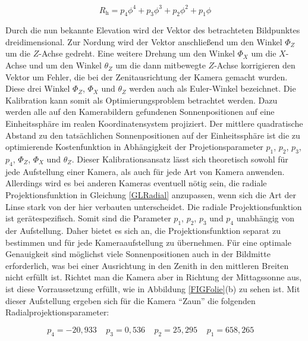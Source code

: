 \documentclass[a4paper,11pt,twoside,german]{article}
\newcommand{\absatz}{\smallbreak}
\begin{document}
\begin{equation}
\label{GLRadial}
R_\mathrm{h} = p_4 \phi ^ 4 + p_3 \phi ^ 3 + p_2 \phi ^ 2 + p_1 \phi
\end{equation}

Durch die nun bekannte Elevation wird der Vektor des betrachteten Bildpunktes
dreidimensional. Zur Nordung wird der Vektor anschließend um den Winkel $\Phi_Z$
um die $Z$-Achse gedreht. Eine weitere Drehung um den Winkel $\Phi_X$ um die
$X$-Achse und um den Winkel $\theta_Z$ um die dann mitbewegte $Z$-Achse
korrigieren den Vektor um Fehler, die bei der Ze\-nit\-aus\-rich\-tung der
Kamera gemacht wurden. Diese drei Winkel $\Phi_Z$, $\Phi_X$ und $\theta_Z$
werden auch als Euler-Winkel bezeichnet.
\absatz
Die Kalibration kann somit als Optimierungsproblem betrachtet werden. Dazu
werden alle auf den Kamerabildern gefundenen Sonnenpositionen auf eine
Einheitssphäre im realen Koordinatensystem projiziert. Der mittlere quadratische
Abstand zu den tatsächlichen Sonnenpositionen auf der Einheitssphäre ist die zu
optimierende Kostenfunktion in Ab\-häng\-ig\-keit der Projetionsparameter $p_1$,
$p_2$, $p_3$, $p_4$, $\Phi_Z$, $\Phi_X$ und $\theta_Z$.
\absatz
Dieser Kalibrationsansatz lässt sich theoretisch sowohl für jede Aufstellung
einer Kamera, als auch für jede Art von Kamera anwenden. Allerdings wird es bei
anderen Kameras eventuell nötig sein, die radiale Projektionsfunktion in
Gleichung \ref{GLRadial} anzupassen, wenn sich die Art der Linse stark von der
hier verbauten unterscheidet.
\absatz
Die radiale Projektionsfunktion ist gerätespezifisch. Somit sind die Parameter 
$p_1$, $p_2$, $p_3$ und $p_4$ unabhängig von der Aufstellung. Daher bietet es
sich an, die Projektionsfunktion separat zu bestimmen und für jede
Kameraaufstellung zu übernehmen. Für eine optimale Genauigkeit sind
möglichst viele Sonnenpositionen auch in der Bildmitte erforderlich, was bei
einer Ausrichtung in den Zenith in den mittleren Breiten nicht erfüllt ist.
Richtet man die Kamera aber in Richtung der Mittagssonne aus, ist diese
Vorraussetzung erfüllt, wie in Abbildung \ref{FIGFolie}(b) zu sehen ist.
Mit dieser Aufstellung ergeben sich für die Kamera \enquote{Zaun} 
die folgenden Radialprojektionsparameter:

\begin{equation}
p_4 = -20,933 \;\;\;\;
p_3 = 0,536   \;\;\;\;
p_2 = 25,295  \;\;\;\;
p_1 = 658,265 \;\;\;\;
\end{equation}
\end{document}
